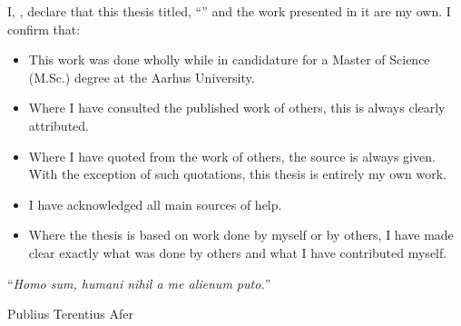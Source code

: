 \documentclass[
11pt, %
english, %
singlespacing, %
headsepline, %
]{MastersDoctoralThesis} %
\begin{document}

\begin{declaration}
\addchaptertocentry{\authorshipname} %
\noindent I, \authorname, declare that this thesis titled, \enquote{\ttitle} and the work presented in it are my own. I confirm that:

\begin{itemize} 
\item This work was done wholly while in candidature for a Master of Science (M.Sc.) degree at the Aarhus University.
\item Where I have consulted the published work of others, this is always clearly attributed.
\item Where I have quoted from the work of others, the source is always given. With the exception of such quotations, this thesis is entirely my own work.
\item I have acknowledged all main sources of help.
\item Where the thesis is based on work done by myself or by others, I have made clear exactly what was done by others and what I have contributed myself.\\
\end{itemize}
 
 
\end{declaration}

\clearpage


\vspace*{0.2\textheight}

\noindent\enquote{\itshape Homo sum, humani nihil a me alienum puto.}\bigbreak

\hfill Publius Terentius Afer
\end{document}
